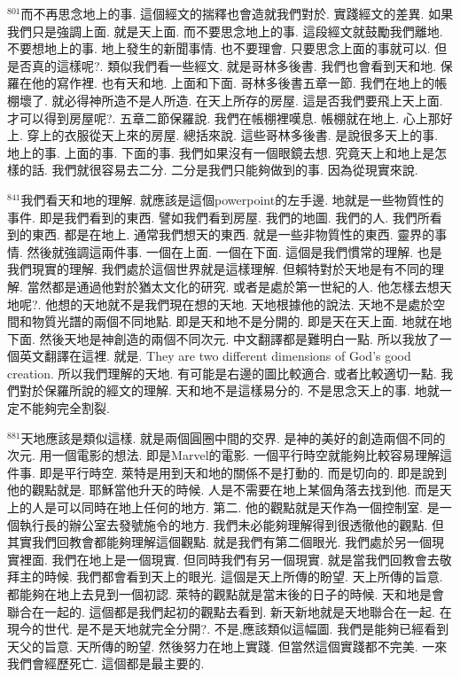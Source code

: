 \documentclass{book}
\begin{document}
$^{801}$而不再思念地上的事.
這個經文的揣釋也會造就我們對於.
實踐經文的差異.
如果我們只是強調上面.
就是天上面.
而不要思念地上的事.
這段經文就鼓勵我們離地.
不要想地上的事.
地上發生的新聞事情.
也不要理會.
只要思念上面的事就可以.
但是否真的這樣呢?.
類似我們看一些經文.
就是哥林多後書.
我們也會看到天和地.
保羅在他的寫作裡.
也有天和地.
上面和下面.
哥林多後書五章一節.
我們在地上的帳棚壞了.
就必得神所造不是人所造.
在天上所存的房屋.
這是否我們要飛上天上面.
才可以得到房屋呢?.
五章二節保羅說.
我們在帳棚裡嘆息.
帳棚就在地上.
心上那好上.
穿上的衣服從天上來的房屋.
總括來說.
這些哥林多後書.
是說很多天上的事.
地上的事.
上面的事.
下面的事.
我們如果沒有一個眼鏡去想.
究竟天上和地上是怎樣的話.
我們就很容易去二分.
二分是我們只能夠做到的事.
因為從現實來說.

$^{841}$我們看天和地的理解.
就應該是這個powerpoint的左手邊.
地就是一些物質性的事件.
即是我們看到的東西.
譬如我們看到房屋.
我們的地圖.
我們的人.
我們所看到的東西.
都是在地上.
通常我們想天的東西.
就是一些非物質性的東西.
靈界的事情.
然後就強調這兩件事.
一個在上面.
一個在下面.
這個是我們慣常的理解.
也是我們現實的理解.
我們處於這個世界就是這樣理解.
但賴特對於天地是有不同的理解.
當然都是通過他對於猶太文化的研究.
或者是處於第一世紀的人.
他怎樣去想天地呢?.
他想的天地就不是我們現在想的天地.
天地根據他的說法.
天地不是處於空間和物質光譜的兩個不同地點.
即是天和地不是分開的.
即是天在天上面.
地就在地下面.
然後天地是神創造的兩個不同次元.
中文翻譯都是難明白一點.
所以我放了一個英文翻譯在這裡.
就是.
They are two different dimensions of God's good creation.
所以我們理解的天地.
有可能是右邊的圖比較適合.
或者比較適切一點.
我們對於保羅所說的經文的理解.
天和地不是這樣易分的.
不是思念天上的事.
地就一定不能夠完全割裂.

$^{881}$天地應該是類似這樣.
就是兩個圓圈中間的交界.
是神的美好的創造兩個不同的次元.
用一個電影的想法.
即是Marvel的電影.
一個平行時空就能夠比較容易理解這件事.
即是平行時空.
萊特是用到天和地的關係不是打動的.
而是切向的.
即是說到他的觀點就是.
耶穌當他升天的時候.
人是不需要在地上某個角落去找到他.
而是天上的人是可以同時在地上任何的地方.
第二.
他的觀點就是天作為一個控制室.
是一個執行長的辦公室去發號施令的地方.
我們未必能夠理解得到很透徹他的觀點.
但其實我們回教會都能夠理解這個觀點.
就是我們有第二個眼光.
我們處於另一個現實裡面.
我們在地上是一個現實.
但同時我們有另一個現實.
就是當我們回教會去敬拜主的時候.
我們都會看到天上的眼光.
這個是天上所傳的盼望.
天上所傳的旨意.
都能夠在地上去見到一個初認.
萊特的觀點就是當末後的日子的時候.
天和地是會聯合在一起的.
這個都是我們起初的觀點去看到.
新天新地就是天地聯合在一起.
在現今的世代.
是不是天地就完全分開?.
不是,應該類似這幅圖.
我們是能夠已經看到天父的旨意.
天所傳的盼望.
然後努力在地上實踐.
但當然這個實踐都不完美.
一來我們會經歷死亡.
這個都是最主要的.
\end{document}
